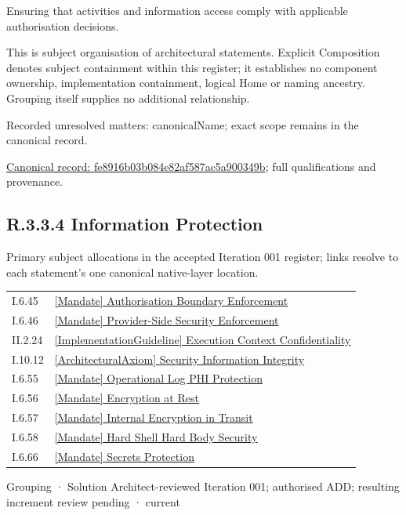 Ensuring that activities and information access comply with applicable authorisation decisions.



This is subject organisation of architectural statements. Explicit Composition denotes subject containment within this register; it establishes no component ownership, implementation containment, logical Home or naming ancestry. Grouping itself supplies no additional relationship.


{\small Recorded unresolved matters: canonicalName; exact scope remains in the canonical record.}\par
{\footnotesize \href{../../../../continuum/grouping/fe8916b03b084e82af587ac5a900349b.md}{Canonical record: fe8916b03b084e82af587ac5a900349b}; full qualifications and provenance.}\par
\subsection*{R.3.3.4 Information Protection}
\label{navigation:R.3.3.4}

Primary subject allocations in the accepted Iteration 001 register; links resolve to each statement’s one canonical native-layer location.\par
\begin{longtable}{p{.22\linewidth}p{.73\linewidth}}
I.6.45 & \hyperref[element:e04672ef7f2341b68c09a0348742a861]{[Mandate] Authorisation Boundary Enforcement} \\
I.6.46 & \hyperref[element:d93b50d0abe04c47bf09759627785745]{[Mandate] Provider-Side Security Enforcement} \\
II.2.24 & \hyperref[element:ddc28f789d69433686ef40561fec5750]{[ImplementationGuideline] Execution Context Confidentiality} \\
I.10.12 & \hyperref[element:52083b57c01d4262bf965afa96489136]{[ArchitecturalAxiom] Security Information Integrity} \\
I.6.55 & \hyperref[element:ab99a48c29c14a1883e820baf98b643a]{[Mandate] Operational Log PHI Protection} \\
I.6.56 & \hyperref[element:4522bf0326334607a4a6177c819e61b6]{[Mandate] Encryption at Rest} \\
I.6.57 & \hyperref[element:4b540b55db1b4c1197482d8f29d70e45]{[Mandate] Internal Encryption in Transit} \\
I.6.58 & \hyperref[element:fb7783088c894106a017912467a9e40d]{[Mandate] Hard Shell Hard Body Security} \\
I.6.66 & \hyperref[element:4547bd339ff143c988391159e3407f20]{[Mandate] Secrets Protection} \\
\end{longtable}
\label{element:d2f8fcaac9984a12beab502d1944ea25}
{\small Grouping · Solution Architect-reviewed Iteration 001; authorised ADD; resulting increment review pending · current}\par

